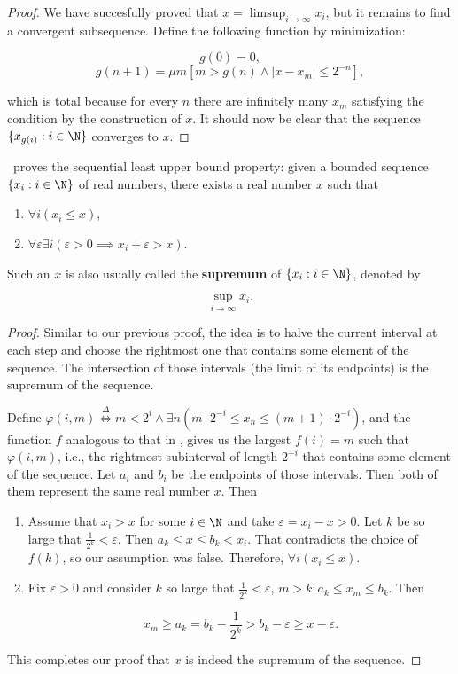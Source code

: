 \documentclass[../main.tex]{memoir}
\begin{document}
\begin{proof}
  We have succesfully proved that $x = \limsup_{i \to \infty} x_i$, but it remains to find a convergent subsequence. Define the following function by minimization:

  \[ g(0) = 0, \]
  \[ g(n + 1) = \mu m [m > g(n) \land |x - x_m| \le 2^{-n}], \]

  which is total because for every $n$ there are infinitely many $x_m$ satisfying the condition by the construction of $x$. It should now be clear that the sequence $\{x_{g(i)}: i \in \N\}$ converges to $x$.
\end{proof}

\begin{theorem}
  \label{thm:aca-lub}

  \aca\ proves the sequential least upper bound property: given a bounded sequence $\{x_i: i \in \N\}$ of real numbers, there exists a real number $x$ such that

  \begin{enumerate}
  \item $\forall i (x_i \le x)$,
  \item $\forall \varepsilon \exists i (\varepsilon > 0 \implies x_i + \varepsilon > x)$.
  \end{enumerate}

  Such an $x$ is also usually called the \textbf{supremum} of $\{x_i: i \in \N\}$, denoted by

  \[ \sup_{i \to \infty} x_i. \]
\end{theorem}
\begin{proof}
  Similar to our previous proof, the idea is to halve the current interval at each step and choose the rightmost one that contains some element of the sequence. The intersection of those intervals (the limit of its endpoints) is the supremum of the sequence.

  Define $\varphi(i, m) \overset{\Delta}{\iff} m < 2^i \land \exists n (m \cdot 2^{-i} \le x_n \le (m + 1) \cdot 2^{-i})$, and the function $f$ analogous to that in , gives us the largest $f(i) = m$ such that $\varphi(i, m)$, i.e., the rightmost subinterval of length $2^{-i}$ that contains some element of the sequence. Let $a_i$ and $b_i$ be the endpoints of those intervals. Then both of them represent the same real number $x$. Then

  \begin{enumerate}
  \item Assume that $x_i > x$ for some $i \in \N$ and take $\varepsilon = x_i - x > 0$. Let $k$ be so large that $\frac{1}{2^k} < \varepsilon$. Then $a_k \le x \le b_k < x_i$. That contradicts the choice of $f(k)$, so our assumption was false. Therefore, $\forall i (x_i \le x)$.
  \item Fix $\varepsilon > 0$ and consider $k$ so large that $\frac{1}{2^k} < \varepsilon$, $m > k: a_k \le x_m \le b_k$. Then

    \[ x_m \ge a_k = b_k - \frac{1}{2^k} > b_k - \varepsilon \ge x - \varepsilon. \]
  \end{enumerate}

  This completes our proof that $x$ is indeed the supremum of the sequence.
\end{proof}
\end{document}
